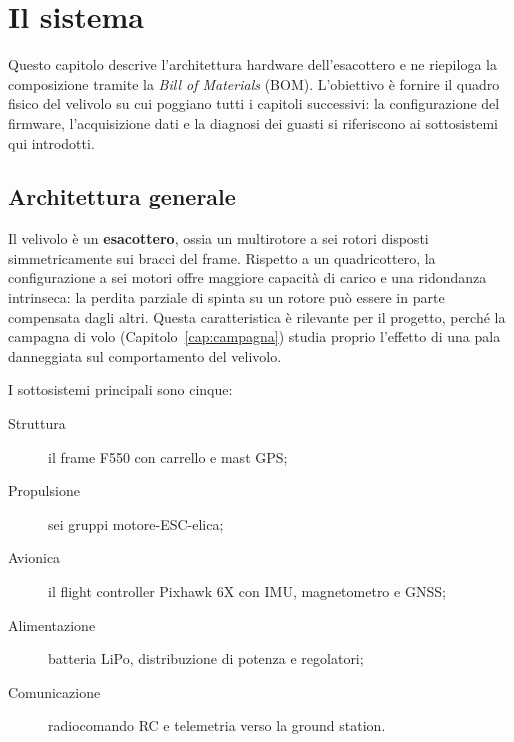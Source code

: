 \chapter{Il sistema}
\label{cap:sistema}

Questo capitolo descrive l'architettura hardware dell'esacottero e ne riepiloga
la composizione tramite la \emph{Bill of Materials} (BOM). L'obiettivo \`e
fornire il quadro fisico del velivolo su cui poggiano tutti i capitoli
successivi: la configurazione del firmware, l'acquisizione dati e la diagnosi
dei guasti si riferiscono ai sottosistemi qui introdotti.

\section{Architettura generale}

Il velivolo \`e un \textbf{esacottero}, ossia un multirotore a sei rotori
disposti simmetricamente sui bracci del frame. Rispetto a un quadricottero,
la configurazione a sei motori offre maggiore capacit\`a di carico e una
ridondanza intrinseca: la perdita parziale di spinta su un rotore pu\`o essere
in parte compensata dagli altri. Questa caratteristica \`e rilevante per il
progetto, perch\'e la campagna di volo (Capitolo~\ref{cap:campagna}) studia
proprio l'effetto di una pala danneggiata sul comportamento del velivolo.

I sottosistemi principali sono cinque:
\begin{description}
  \item[Struttura] il frame F550 con carrello e mast GPS;
  \item[Propulsione] sei gruppi motore-ESC-elica;
  \item[Avionica] il flight controller Pixhawk 6X con IMU, magnetometro e GNSS;
  \item[Alimentazione] batteria LiPo, distribuzione di potenza e regolatori;
  \item[Comunicazione] radiocomando RC e telemetria verso la ground station.
\end{description}



